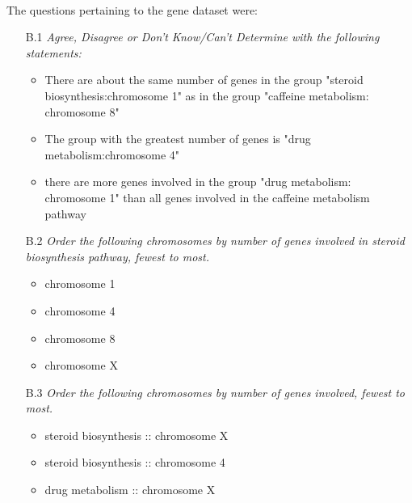 \noindent \\  The questions pertaining to the gene dataset were: 


\begin{itemize}
\item[B.1]\emph{Agree, Disagree or Don't Know/Can't Determine with the following statements:}
\begin{itemize}
\item There are about the same number of genes in the group "steroid biosynthesis:chromosome 1" as in the group "caffeine metabolism: chromosome 8"
\item The group with the greatest number of genes is "drug metabolism:chromosome 4"
\item there are more genes involved in the group "drug metabolism: chromosome 1" than all genes involved in the caffeine metabolism pathway
\end{itemize}

\item[B.2]\emph{Order the following chromosomes by number of genes involved in steroid biosynthesis pathway, fewest to most.}
\begin{itemize}
\item chromosome 1
\item chromosome 4
\item chromosome 8 
\item chromosome X
\end{itemize}

\item[B.3]\emph{Order the following chromosomes by number of genes involved, fewest to most.}
\begin{itemize}
\item steroid biosynthesis :: chromosome X
\item steroid biosynthesis :: chromosome 4
\item drug metabolism :: chromosome X
\end{itemize} 
\end{itemize} 


